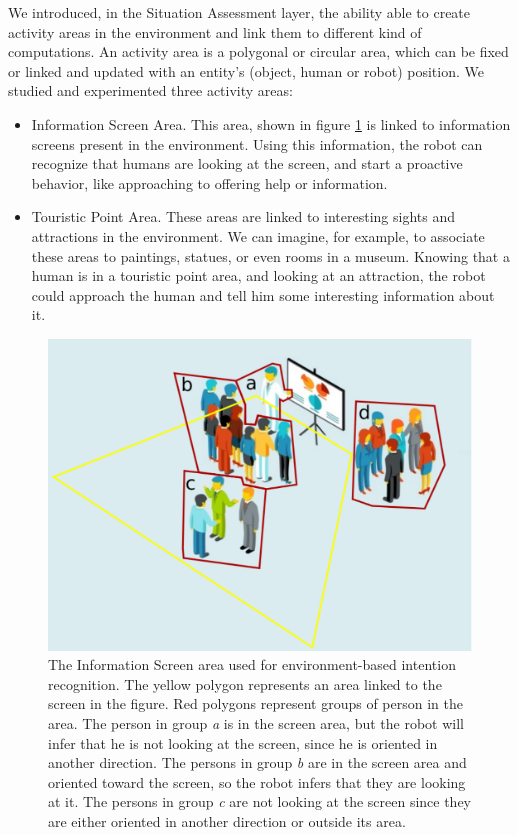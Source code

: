 We introduced, in the Situation Assessment layer, the ability able to create activity areas in the environment and link them to different kind of computations. An activity area is a polygonal or circular area, which can be fixed or linked and updated with an entity's (object, human or robot) position. We studied and experimented three activity areas:

\begin{itemize}
\item Information Screen Area. This area, shown in figure \ref{fig:spencer-screen_area} is linked to information screens present in the environment. Using this information, the robot can recognize that humans are looking at the screen, and  start a proactive behavior, like approaching to offering help or information.
\item Touristic Point Area. These areas are linked to interesting sights and attractions in the environment. We can imagine, for example, to associate these areas to paintings, statues, or even rooms in a museum. Knowing that a human is in a touristic point area, and looking at an attraction, the robot could approach the human and tell him some interesting information about it.
\end{itemize}

\begin{figure}[ht!]
	\centering
	\includegraphics[scale=0.45]{img/case_study/spencer/environment_intention.pdf}
	\caption[Environment-Based Situation Assessment]{The Information Screen area used for environment-based intention recognition. The yellow polygon represents an area linked to the screen in the figure. Red polygons represent groups of person in the area. The person in group \textit{a} is in the screen area, but the robot will infer that he is not looking at the screen, since he is oriented in another direction. The persons in group \textit{b} are in the screen area and oriented toward the screen, so the robot infers that they are looking at it. The persons in group \textit{c} are not looking at the screen since they are either oriented in another direction or outside its area.}
	\label{fig:spencer-screen_area}
\end{figure}

